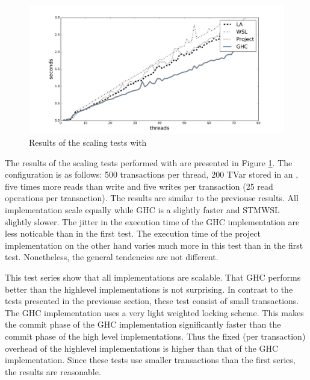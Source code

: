 \begin{figure}
 \centering
 \includegraphics[scale=0.4]{Figures/Scaling2}
\caption[Runtime: Scaling Test II]{Results of the scaling tests with }
\label{fig:scaling2}
\end{figure}

The results of the scaling tests performed with  are presented in Figure \ref{fig:scaling2}. The configuration 
is as follows: 500 transactions per thread, 200 TVar stored in an , five times more reads than write and
five writes per transaction (25 read operations per transaction). The results are similar to the previouse results. All implementation scale equally while
GHC is a slightly faster and STMWSL slightly slower. The jitter in the execution time of the GHC implementation are less noticable than 
in the first test. The execution time of the project implementation on the other hand varies much more in this test than
in the first test. Nonetheless, the general tendencies are not different. 

This test series show that all implementations are scalable. That GHC performs better than the highlevel implementations
is not surprising. In contrast to the tests presented in the previouse section, these test consist of small transactions.
The GHC implementation uses a very light weighted locking scheme. This makes the commit phase of the GHC implementation
significantly faster than the commit phase of the high level implementations. Thus the fixed (per transaction) overhead
of the highlevel implementations is higher than that of the GHC implementation. Since these tests use smaller transactions
than the first series, the results are reasonable.

